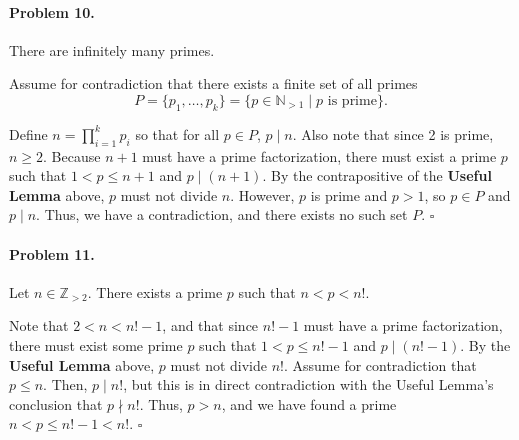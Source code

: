 \documentclass[12pt]{article}
\begin{document}
\paragraph{Problem 10.} There are infinitely many primes.

Assume for contradiction that there exists a finite set of all primes \[P=\{ p_1, \dots, p_k \} = \{ p \in \mathbb N_{>1} \mid p \text{ is prime}\}.\]

Define $n = \prod_{i=1}^k p_i$ so that for all $p \in P$, $p \mid n$. Also note that since 2 is prime, $n \ge 2$. Because $n+1$ must have a prime factorization, there must exist a prime $p$ such that $1 < p \le n+1$ and $p \mid (n+1)$. By the contrapositive of the \textbf{Useful Lemma} above, $p$ must not divide $n$. However, $p$ is prime and $p>1$, so $p \in P$ and $p \mid n$. Thus, we have a contradiction, and there exists no such set $P$. $\square$

\paragraph{Problem 11.} Let $n \in \mathbb Z_{>2}$. There exists a prime $p$ such that $n < p < n!$.

Note that $2 < n < n! - 1$, and that since $n!-1$ must have a prime factorization, there must exist some prime $p$ such that $1 < p \le n! - 1$ and $p \mid (n! - 1)$. By the \textbf{Useful Lemma} above, $p$ must not divide $n!$. Assume for contradiction that $p \le n$. Then, $p \mid n!$, but this is in direct contradiction with the Useful Lemma's conclusion that $p \nmid n!$. Thus, $p > n$, and we have found a prime $n < p \le n! - 1 < n!$. $\square$


\newpage{}
\end{document}
